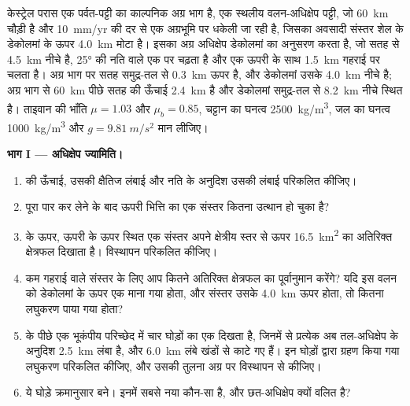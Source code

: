 \begin{problem}
\label{pb:b3:orogenic-wedges:1}
केस्ट्रेल परास एक पर्वत-पट्टी का काल्पनिक अग्र भाग है, एक स्थलीय
वलन-अधिक्षेप पट्टी, जो \qty{60}{km} चौड़ी है और \qty{10}{mm/yr} की दर से
एक अग्रभूमि पर धकेली जा रही है, जिसका अवसादी संस्तर शेल के
डेकोलमां के ऊपर \qty{4.0}{km} मोटा है। इसका अग्र अधिक्षेप डेकोलमां का अनुसरण करता है, जो
सतह से \qty{4.5}{km} नीचे है, \ang{25} की नति वाले एक  पर चढ़ता है और
एक ऊपरी  के साथ \qty{1.5}{km} गहराई पर चलता है। अग्र भाग पर सतह
समुद्र-तल से \qty{0.3}{km} ऊपर है, और डेकोलमां उसके \qty{4.0}{km} नीचे है;
अग्र भाग से \qty{60}{km} पीछे सतह की ऊँचाई \qty{2.4}{km} है और डेकोलमां
समुद्र-तल से \qty{8.2}{km} नीचे स्थित है। ताइवान की भाँति $\mu = 1.03$ और $\mu_b =
0.85$, चट्टान का घनत्व \qty{2500}{kg/m^3}, जल का घनत्व \qty{1000}{kg/m^3} और
$g = \qty{9.81}{m/s^2}$ मान लीजिए।

\medskip\noindent\textbf{भाग I --- अधिक्षेप ज्यामिति।}
\begin{enumerate}
  \item {} की ऊँचाई, उसकी क्षैतिज लंबाई और
        नति के अनुदिश उसकी लंबाई परिकलित कीजिए।
  \item पूरा  पार कर लेने के बाद ऊपरी भित्ति का एक संस्तर
        कितना उत्थान हो चुका है?
  \item {} के ऊपर, ऊपरी  के ऊपर स्थित एक संस्तर
        अपने क्षेत्रीय स्तर से ऊपर \qty{16.5}{km^2} का अतिरिक्त क्षेत्रफल दिखाता है। विस्थापन परिकलित कीजिए।
  \item कम गहराई वाले संस्तर के लिए आप कितने अतिरिक्त क्षेत्रफल का पूर्वानुमान करेंगे? यदि इस वलन को
        डेकोलमां के ऊपर एक  माना गया होता, और संस्तर उसके
        \qty{4.0}{km} ऊपर होता, तो कितना लघुकरण पाया गया होता?
  \item {} के पीछे एक भूकंपीय परिच्छेद में चार घोड़ों का एक  दिखता है, जिनमें से प्रत्येक
        अब तल-अधिक्षेप के अनुदिश \qty{2.5}{km} लंबा है, और \qty{6.0}{km} लंबे खंडों से
        काटे गए हैं। इन घोड़ों द्वारा ग्रहण किया गया लघुकरण परिकलित कीजिए, और
        उसकी तुलना अग्र  पर विस्थापन से कीजिए।
  \item ये घोड़े क्रमानुसार बने। इनमें सबसे नया कौन-सा है, और छत-अधिक्षेप
        क्यों वलित है?
\end{enumerate}


\end{problem}
